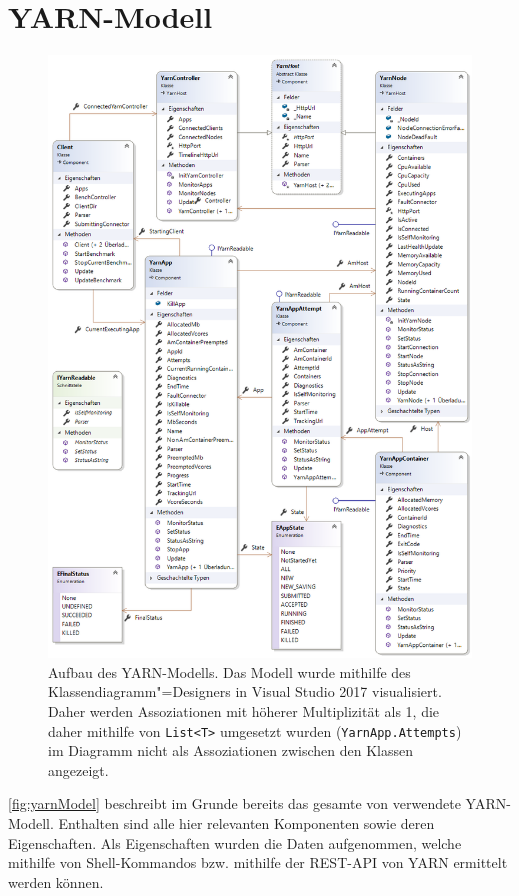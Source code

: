 \section{YARN-Modell}\label{sec:yarnModel}

\begin{figure}
    \includegraphics[width=\columnwidth]{./images/yarnModel.png}
    \caption[Aufbau des YARN-Modells]
    {Aufbau des YARN-Modells. Das Modell wurde mithilfe des Klassendiagramm"=Designers in Visual Studio 2017 visualisiert. Daher werden Assoziationen mit höherer Multiplizität als 1, die daher mithilfe von \texttt{List<T>} umgesetzt wurden (\zB \texttt{YarnApp.Attempts}) im Diagramm nicht als Assoziationen zwischen den Klassen angezeigt.}
    \label{fig:yarnModel}
\end{figure}

\autoref{fig:yarnModel} beschreibt im Grunde bereits das gesamte von \sS verwendete YARN-Modell. Enthalten sind alle hier relevanten Komponenten sowie deren Eigenschaften. Als Eigenschaften wurden die Daten aufgenommen, welche mithilfe von Shell-Kommandos bzw. mithilfe der REST-API von YARN ermittelt werden können.

